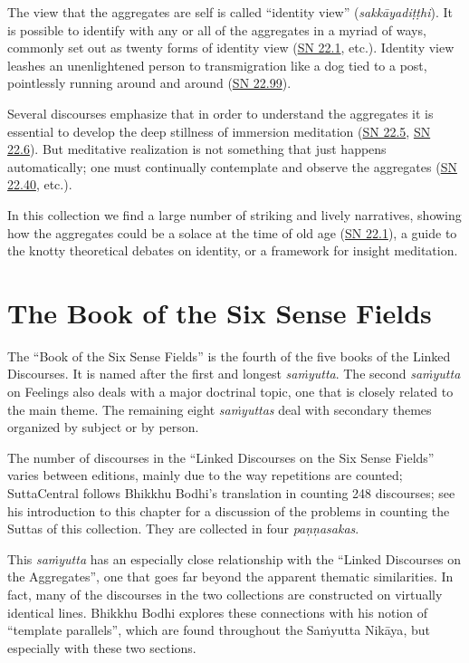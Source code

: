 \documentclass[12pt,openany]{book}%
\begin{document}
The view that the aggregates are self is called “identity view” (\textit{\textsanskrit{sakkāyadiṭṭhi}}). It is possible to identify with any or all of the aggregates in a myriad of ways, commonly set out as twenty forms of identity view (\href{https://suttacentral.net/sn22.1}{SN 22.1}, etc.). Identity view leashes an unenlightened person to transmigration like a dog tied to a post, pointlessly running around and around (\href{https://suttacentral.net/sn22.99}{SN 22.99}).

Several discourses emphasize that in order to understand the aggregates it is essential to develop the deep stillness of immersion meditation (\href{https://suttacentral.net/sn22.5}{SN 22.5}, \href{https://suttacentral.net/sn22.6}{SN 22.6}). But meditative realization is not something that just happens automatically; one must continually contemplate and observe the aggregates (\href{https://suttacentral.net/sn22.40}{SN 22.40}, etc.).

In this collection we find a large number of striking and lively narratives, showing how the aggregates could be a solace at the time of old age (\href{https://suttacentral.net/sn22.1}{SN 22.1}), a guide to the knotty theoretical debates on identity, or a framework for insight meditation.

\section*{The Book of the Six Sense Fields}

The “Book of the Six Sense Fields” is the fourth of the five books of the Linked Discourses. It is named after the first and longest \textit{\textsanskrit{saṁyutta}}. The second \textit{\textsanskrit{saṁyutta}} on Feelings also deals with a major doctrinal topic, one that is closely related to the main theme. The remaining eight \textit{\textsanskrit{saṁyuttas}} deal with secondary themes organized by subject or by person.

The number of discourses in the “Linked Discourses on the Six Sense Fields” varies between editions, mainly due to the way repetitions are counted; SuttaCentral follows Bhikkhu Bodhi’s translation in counting 248 discourses; see his introduction to this chapter for a discussion of the problems in counting the Suttas of this collection. They are collected in four \textit{\textsanskrit{paṇṇasakas}}.

This \textit{\textsanskrit{saṁyutta}} has an especially close relationship with the “Linked Discourses on the Aggregates”, one that goes far beyond the apparent thematic similarities. In fact, many of the discourses in the two collections are constructed on virtually identical lines. Bhikkhu Bodhi explores these connections with his notion of “template parallels”, which are found throughout the \textsanskrit{Saṁyutta} \textsanskrit{Nikāya}, but especially with these two sections.
\end{document}
